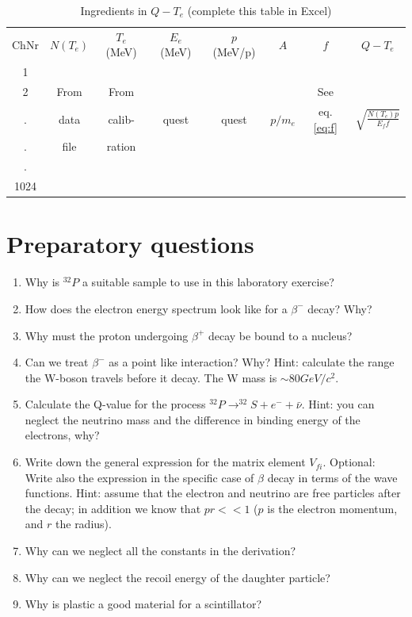 \documentclass[a4,11pt, notitlepage]{article}
\begin{document}
\begin{table}[]
\caption{Ingredients in $Q-T_e$ (complete this table in Excel)}
\label{tab:fkp}
\centering
\begin{tabular}{|c|c|c|c|c|c|c|c|}
ChNr & $N(T_e)$ & $T_{e}$ (MeV) & $E_e$ (MeV) & $p$ (MeV/p) & $A$ & $f$ & $Q-T_e$ \\
1 & &  &  &  &  &  & \\
2 & From & From &  &  &  &See  & \\
. & data & calib- & quest & quest & $p/m_e$ & eq. \ref{eq:f} & $\sqrt{\frac{N(T_e)p}{E_ff}}$\\
. &  file & ration &  &  &  & \\
. &  &  &  &  &  &  & \\
1024 &  &  &  &  &  &  & 
\end{tabular}
\end{table}



\section{Preparatory questions}

\begin{enumerate}
\item Why is $^{32}P$ a suitable sample to use in this laboratory exercise?
\label{q:P}

\item How does the electron energy spectrum look like for a $\beta^-$ decay? Why? 
\label{q:cont}

\item Why must the proton undergoing $\beta^+$ decay be bound to a nucleus?
\label{q:+}

\item Can we treat $\beta^-$ as a point like interaction? Why? Hint: calculate the range the W-boson travels before it decay. The W mass is $\sim 80 GeV/c^2$. 
\label{q:point}

\item Calculate the Q-value for the process $^{32}P\rightarrow ^{32}S + e^- + \bar{\nu}$. Hint: you can neglect the neutrino mass and the difference in binding energy of the electrons, why? 

\item Write down the general expression for the matrix element $V_{fi}$. Optional: Write also the expression in the specific case of $\beta$ decay in terms of the wave functions. Hint: assume that the electron and neutrino are free particles after the decay; in addition we know that $pr<<1$ ($p$ is the electron momentum, and $r$ the radius).  
\label{q:V}

\item Why can we neglect all the constants in the derivation?
\label{q:const}


\item Why can we neglect the recoil energy of the daughter particle? 
\label{q:recoil}

\item Why is plastic a good material for a scintillator?
\label{q:plastic}


\label{q:q}
 
\end{enumerate}
\end{document}
